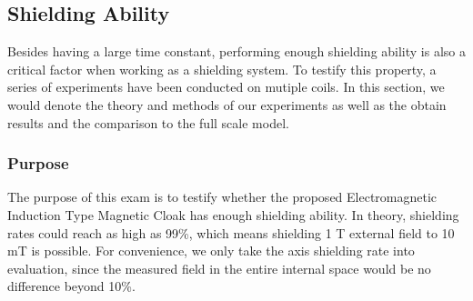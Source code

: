 \newpage
\subsection{Shielding Ability}
Besides having a large time constant,
performing enough shielding ability is also a critical factor when working as a shielding system.
To testify this property,  a series of experiments have been conducted on mutiple coils.
In this section, we would denote the theory and methods of our experiments as well as the obtain results and the comparison to the full scale model.

\subsubsection{Purpose}
The purpose of this exam is to testify whether the proposed Electromagnetic Induction Type Magnetic Cloak has enough shielding ability.
In theory, shielding rates could reach as high as 99\%, which means shielding 1 T external field to 10 mT is possible.
For convenience, we only take the axis shielding rate into evaluation,
since the measured field in the entire internal space would be no difference beyond 10\%.

